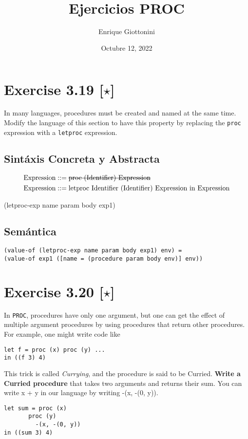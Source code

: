 \documentclass[11pt]{article}
\title{ Ejercicios PROC}
\author{ Enrique Giottonini }
\date{Octubre 12, 2022}
\begin{document}
\maketitle	

\section*{Exercise 3.19 [$\star$]}
In many languages, procedures must be created and named at the same time. Modify the language of this section to have this property by replacing the \verb|proc| expression with a \verb|letproc| expression.

\subsection*{Sintáxis Concreta y Abstracta}
\begin{align*}
\text{Expression} &::=  \text{\sout{proc (Identifier) Expression}} \\
\text{Expression}	&::= \text{letproc Identifier (Identifier) Expression in Expression}
\end{align*}

\begin{center}
(letproc-exp name param body exp1)
\end{center}

\subsection*{Semántica}

\begin{lstlisting}
(value-of (letproc-exp name param body exp1) env) =
(value-of exp1 ([name = (procedure param body env)] env))
\end{lstlisting}

\section*{Exercise 3.20 [$\star$]}
In \verb|PROC|, procedures have only one argument, but one can get the effect of multiple argument procedures by using procedures that return other procedures. For example, one might write code like
\begin{lstlisting}
let f = proc (x) proc (y) ...
in ((f 3) 4)
\end{lstlisting}
This trick is called \textit{Currying}, and the procedure is said to be Curried.\textbf{ Write a Curried procedure} that takes two arguments and returns their sum. You can write x + y in
our language by writing -(x, -(0, y)).
\\
\begin{lstlisting}
let sum = proc (x)
	   proc (y)
	     -(x, -(0, y))
in ((sum 3) 4)
\end{lstlisting}
\end{document}

